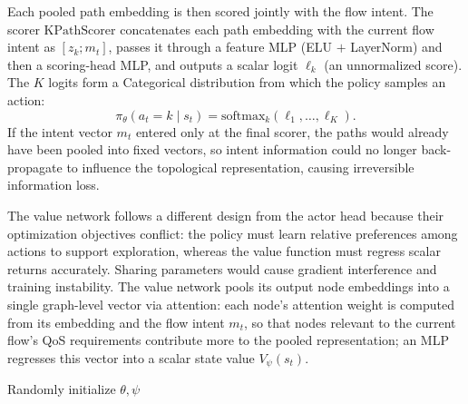 Each pooled path embedding is then scored jointly with the flow intent. The scorer $\mathrm{KPathScorer}$ concatenates each path embedding with the current flow intent as $[z_k; m_t]$, passes it through a feature MLP (ELU $+$ LayerNorm) and then a scoring-head MLP, and outputs a scalar logit $\ell_k$ (an unnormalized score). The $K$ logits form a Categorical distribution from which the policy samples an action:
\begin{equation}
\pi_\theta(a_t\!=\!k\mid s_t) = \mathrm{softmax}_k(\ell_1,\dots,\ell_K).
\label{eq:policy}
\end{equation}
If the intent vector $m_t$ entered only at the final scorer, the paths would already have been pooled into fixed vectors, so intent information could no longer back-propagate to influence the topological representation, causing irreversible information loss.

The value network follows a different design from the actor head because their optimization objectives conflict: the policy must learn relative preferences among actions to support exploration, whereas the value function must regress scalar returns accurately. Sharing parameters would cause gradient interference and training instability. The value network pools its output node embeddings into a single graph-level vector via attention: each node's attention weight is computed from its embedding and the flow intent $m_t$, so that nodes relevant to the current flow's QoS requirements contribute more to the pooled representation; an MLP regresses this vector into a scalar state value $V_\psi(s_t)$.

\begin{algorithm}[t]
\caption{PPO Training for QoS-FiLM}
\label{alg:ppo}
Randomly initialize $\theta,\psi$\;
\end{algorithm}

